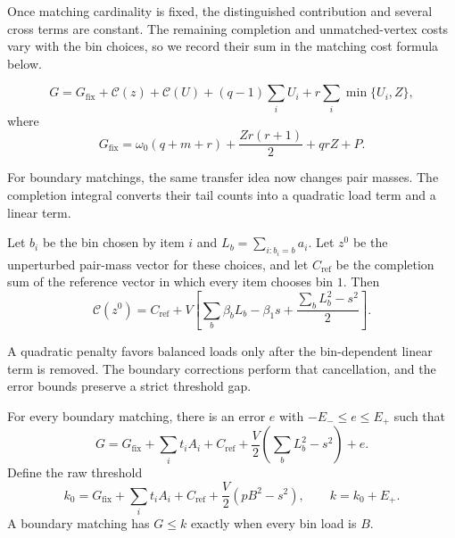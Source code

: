 Once matching cardinality is fixed, the distinguished contribution
and several cross terms are constant. The remaining completion and
unmatched-vertex costs vary with the bin choices, so we record their
sum in the matching cost formula below.

\begin{proposition}
\label{prop:average-invoice}
\begin{equation}\label{eq:expected-remaining-invoice}
 G=G_{\mathrm{fix}}+\mathcal C(z)+\mathcal C(U)
       +(q-1)\sum_i U_i+r\sum_i\min\{U_i,Z\},
\end{equation}
where
\[
 G_{\mathrm{fix}}=
 \omega_0(q+m+r)+\frac{Zr(r+1)}2+qrZ+P.
\]
\end{proposition}

For boundary matchings, the same transfer idea now changes pair
masses. The completion integral converts their tail counts into a
quadratic load term and a linear term.

\begin{proposition}
\label{prop:average-windows}
Let $b_i$ be the bin chosen by item $i$ and
$L_b=\sum_{i:b_i=b}a_i$. Let $z^0$ be the unperturbed pair-mass
vector for these choices, and let $C_{\mathrm{ref}}$ be the
completion sum of the reference vector in which every item chooses
bin $1$. Then
\begin{equation}\label{eq:expected-bin-identity}
 \mathcal C(z^0)=C_{\mathrm{ref}}+
 V\left[\sum_b\beta_bL_b-\beta_1s+
             \frac{\sum_bL_b^2-s^2}{2}\right].
\end{equation}
\end{proposition}

A quadratic penalty favors balanced loads only after the bin-dependent
linear term is removed. The boundary corrections perform that
cancellation, and the error bounds preserve a strict threshold gap.

\begin{proposition}
\label{prop:average-boundary-gap}
For every boundary matching, there is an error $e$ with
$-E_-\le e\le E_+$ such that
\begin{equation}\label{eq:expected-quadratic-gap}
 G=G_{\mathrm{fix}}+\sum_i t_iA_i+C_{\mathrm{ref}}+
       \frac V2\left(\sum_bL_b^2-s^2\right)+e.
\end{equation}
Define the raw threshold
\begin{equation}\label{eq:expected-raw-threshold}
 k_0=G_{\mathrm{fix}}+\sum_i t_iA_i+C_{\mathrm{ref}}
              +\frac V2(pB^2-s^2),\qquad k=k_0+E_+.
\end{equation}
A boundary matching has $G\le k$ exactly when every bin load is $B$.
\end{proposition}


